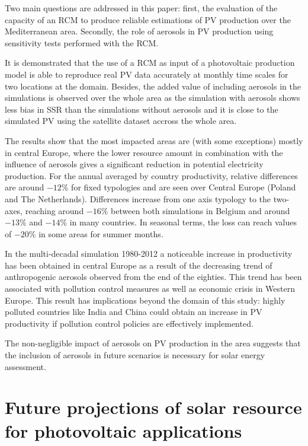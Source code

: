Two main questions are addressed in this paper: first, the evaluation of the capacity of an RCM to produce reliable estimations of PV production over the Mediterranean area. Secondly, the role of aerosols in PV production using sensitivity tests performed with the RCM. 

It is demonstrated that the use of a RCM as input of a photovoltaic production model is able to reproduce real PV data accurately at monthly time scales for two locations at the domain. Besides, the added value of including aerosols in the simulations is observed over the whole area as the simulation with aerosols shows less bias in SSR than the simulations without aerosols and it is close to the simulated PV using the satellite dataset accross the whole area. 

The results show that the most impacted areas are (with some exceptions) mostly in central Europe, where the lower resource amount in combination with the influence of aerosols gives a significant reduction in potential electricity production. For the annual averaged by country productivity, relative differences are around $-12\%$ for fixed typologies and are seen over Central Europe (Poland and The Netherlands). Differences increase from one axis typology to the two-axes, reaching around $-16\%$ between both simulations in Belgium and around $-13\%$ and $-14\%$ in many countries. In seasonal terms, the loss can reach values of $-20\%$ in some areas for summer months.

In the multi-decadal simulation 1980-2012 a noticeable increase in productivity has been obtained in central Europe as a result of the decreasing trend of anthropogenic aerosols observed from the end of the eighties. This trend has been associated with pollution control measures as well as economic crisis in Western Europe. This result has implications beyond the domain of this study: highly polluted countries like India and China could obtain an increase in PV productivity if pollution control policies are effectively implemented.

The non-negligible impact of aerosols on PV production in the area suggests that the inclusion of aerosols in future scenarios is necessary for solar energy assessment.

\chapter{Future projections of solar resource for photovoltaic applications}

